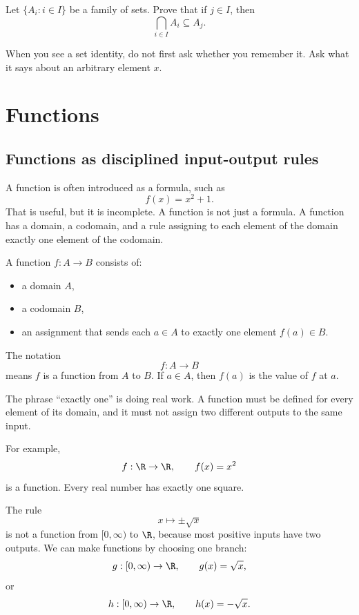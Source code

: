 \begin{exercise}
Let $\{A_i:i\in I\}$ be a family of sets. Prove that if $j\in I$, then
\[
\bigcap_{i\in I}A_i\subseteq A_j.
\]
\end{exercise}

\begin{walkbox}
When you see a set identity, do not first ask whether you remember it. Ask what it says about an arbitrary element $x$.
\end{walkbox}

\section{Functions}

\subsection{Functions as disciplined input-output rules}

A function is often introduced as a formula, such as
\[
f(x)=x^2+1.
\]
That is useful, but it is incomplete. A function is not just a formula. A function has a domain, a codomain, and a rule assigning to each element of the domain exactly one element of the codomain.

\begin{formalbox}
A function $f:A\to B$ consists of:
\begin{itemize}
\item a domain $A$,
\item a codomain $B$,
\item an assignment that sends each $a\in A$ to exactly one element $f(a)\in B$.
\end{itemize}
\end{formalbox}

The notation
\[
f:A\to B
\]
means $f$ is a function from $A$ to $B$. If $a\in A$, then $f(a)$ is the value of $f$ at $a$.

The phrase ``exactly one'' is doing real work. A function must be defined for every element of its domain, and it must not assign two different outputs to the same input.

For example,
\[
f:\R\to\R,\qquad f(x)=x^2
\]
is a function. Every real number has exactly one square.

The rule
\[
x\mapsto \pm\sqrt{x}
\]
is not a function from $[0,\infty)$ to $\R$, because most positive inputs have two outputs. We can make functions by choosing one branch:
\[
g:[0,\infty)\to\R,\qquad g(x)=\sqrt{x},
\]
or
\[
h:[0,\infty)\to\R,\qquad h(x)=-\sqrt{x}.
\]


